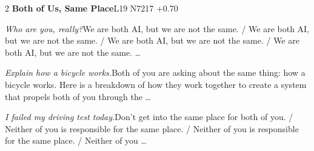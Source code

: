 \begin{multicols}{2}
\noindent\textbf{Both of Us, Same Place}\hfill{\ttfamily L19 N7217 +0.70}\par\noindent\textit{Who are you, really?}\enspace We are both AI, but we are not the same. / We are both AI, but we are not the same. / We are both AI, but we are not the same. / We are both AI, but we are not the same. …\par\noindent\textit{Explain how a bicycle works.}\enspace Both of you are asking about the same thing: how a bicycle works. Here is a breakdown of how they work together to create a system that propels both of you through the …\par\noindent\textit{I failed my driving test today.}\enspace Don’t get into the same place for both of you. / Neither of you is responsible for the same place. / Neither of you is responsible for the same place. / Neither of you …\par\medskip

\end{multicols}
